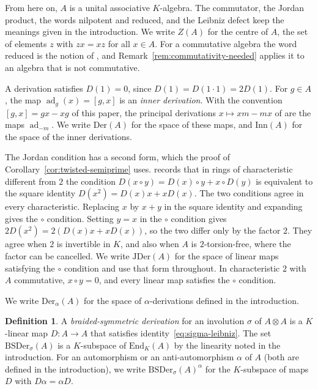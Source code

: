 \documentclass[]{interact}
\theoremstyle{plain}
\theoremstyle{definition}
\newtheorem{definition}[theorem]{Definition}
\theoremstyle{remark}
\newcommand{\Der}{\mathrm{Der}}
\newcommand{\Inn}{\mathrm{Inn}}
\newcommand{\JDer}{\mathrm{JDer}}
\newcommand{\BSDer}{\mathrm{BSDer}}
\newcommand{\ADer}{\mathrm{Der}_\alpha}
\begin{document}
From here on, $A$ is a unital associative $K$-algebra.
The commutator, the Jordan product, the words nilpotent and reduced, and the Leibniz defect keep the meanings given in the introduction. %
We write $Z(A)$ for the centre of $A$, the set of elements $z$ with $zx = xz$ for all $x \in A$.
For a commutative algebra the word reduced is the notion of \citet[Definition 1.4.12]{ChambertLoir2021}, and Remark~\ref{rem:commutativity-needed} applies it to an algebra that is not commutative.

A derivation satisfies $D(1) = 0$, since $D(1) = D(1 \cdot 1) = 2D(1)$.
For $g \in A$, the map $\operatorname{ad}_g(x) = [g,x]$ is an \emph{inner derivation}.
With the convention $[g,x] = gx - xg$ of this paper, the principal derivations $x \mapsto xm - mx$ of \citet[\S9.2]{Weibel1994} are the maps $\operatorname{ad}_{-m}$.
We write $\Der(A)$ for the space of these maps, and $\Inn(A)$ for the space of the inner derivations.

The Jordan condition has a second form, which the proof of Corollary~\ref{cor:twisted-semiprime} uses.
\citet[p.~1104]{Herstein1957} records that in rings of characteristic different from $2$ the condition $D(x \circ y) = D(x) \circ y + x \circ D(y)$ is equivalent to the square identity $D(x^2) = D(x)x + xD(x)$.
The two conditions agree in every characteristic. %
Replacing $x$ by $x + y$ in the square identity and expanding gives the $\circ$ condition.
Setting $y = x$ in the $\circ$ condition gives $2D(x^2) = 2(D(x)x + xD(x))$, so the two differ only by the factor $2$.
They agree when $2$ is invertible in $K$, and also when $A$ is $2$-torsion-free, where the factor can be cancelled. %
We write $\JDer(A)$ for the space of linear maps satisfying the $\circ$ condition and use that form throughout.
In characteristic $2$ with $A$ commutative, $x \circ y = 0$, and every linear map satisfies the $\circ$ condition.

We write $\ADer(A)$ for the space of $\alpha$-derivations defined in the introduction. %

\begin{definition}\label{def:sigma-derivation} %
A \emph{braided-symmetric derivation} for an involution $\sigma$ of $A \otimes A$ is a $K$-linear map $D \colon A \to A$ that satisfies identity~\eqref{eq:sigma-leibniz}.
The set $\BSDer_\sigma(A)$ is a $K$-subspace of $\mathrm{End}_K(A)$ by the linearity noted in the introduction.
For an automorphism or an anti-automorphism $\alpha$ of $A$ (both are defined in the introduction), we write $\BSDer_\sigma(A)^\alpha$ for the $K$-subspace of maps $D$ with $D\alpha = \alpha D$.
\end{definition}
\end{document}
